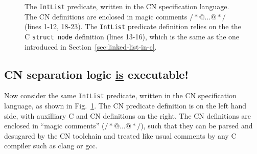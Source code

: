 \begin{figure}[h]
  \begin{center}
    \begin{minipage}[t]{.31\textwidth}
      \vspace{-6.2em}
      \lstset{
      numbers=left,
      firstnumber=1,
      numberfirstline=true
      }
      \scalebox{0.9}{}
    \end{minipage}
    \hspace*{8.5\baselineskip}
    \begin{minipage}[t]{.28\textwidth}
      \lstset{
      numbers=left,
      firstnumber=13,
      numberfirstline=true
      }
      \scalebox{0.9}{}
    \end{minipage}
  \end{center}
  \vspace{-1em}
  \caption{The \texttt{IntList} predicate, written in the CN specification language. The CN definitions are enclosed in magic comments {\color{commentcolour}$/*@ \ldots @*/$} (lines 1-12, 18-23). The \texttt{IntList} predicate definition relies on the the C \texttt{struct node} definition (lines 13-16), which is the same as the one introduced in Section~\ref{sec:linked-list-in-c}.}
  \label{fig:intlist-cn}
\end{figure}

\subsection{CN separation logic \underline{is} executable!}

Now consider the same \texttt{IntList} predicate, written in the CN specification language, as shown in Fig.~\ref{fig:intlist-cn}. The CN predicate definition is on the left hand side, with auxilliary C and CN definitions on the right. The CN definitions are enclosed in ``magic comments'' ({\color{commentcolour}$/*@ \ldots @*/$}), such that they can be parsed and desugared by the CN toolchain and treated like usual comments by any C compiler such as clang or gcc. 


